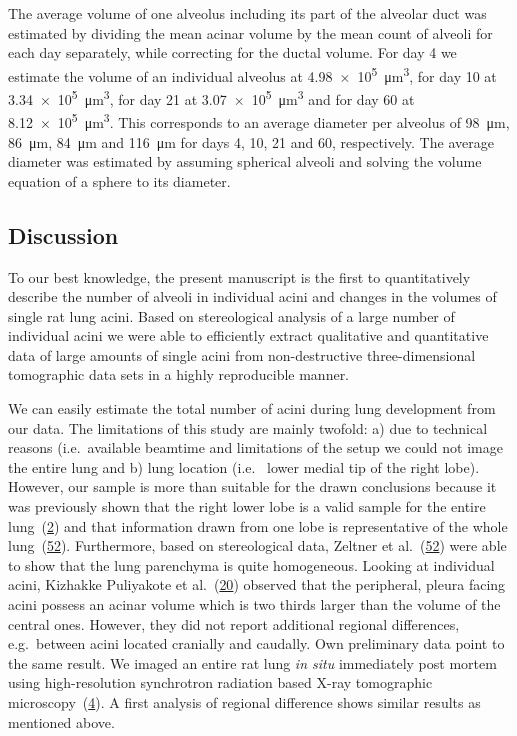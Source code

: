 \documentclass[
  american,
]{article}
\begin{document}
The average volume of one alveolus including its part of the alveolar duct was estimated by dividing the mean acinar volume by the mean count of alveoli for each day separately, while correcting for the ductal volume.
For day 4 we estimate the volume of an individual alveolus at 4.98~×~10\textsuperscript{5}~μm\textsuperscript{3}, for day 10 at 3.34~×~10\textsuperscript{5}~μm\textsuperscript{3}, for day 21 at 3.07~×~10\textsuperscript{5}~μm\textsuperscript{3} and for day 60 at 8.12~×~10\textsuperscript{5}~μm\textsuperscript{3}.
This corresponds to an average diameter per alveolus of 98~μm, 86~μm, 84~μm and 116~μm for days 4, 10, 21 and 60, respectively.
The average diameter was estimated by assuming spherical alveoli and solving the volume equation of a sphere to its diameter.

\hypertarget{discussion}{%
\subsection{Discussion}\label{discussion}}

To our best knowledge, the present manuscript is the first to quantitatively describe the number of alveoli in individual acini and changes in the volumes of single rat lung acini.
Based on stereological analysis of a large number of individual acini we were able to efficiently extract qualitative and quantitative data of large amounts of single acini from non-destructive three-dimensional tomographic data sets in a highly reproducible manner.

We can easily estimate the total number of acini during lung development from our data.
The limitations of this study are mainly twofold: a) due to technical reasons (i.e.~available beamtime and limitations of the setup we could not image the entire lung and b) lung location (i.e.~ lower medial tip of the right lobe).
However, our sample is more than suitable for the drawn conclusions because it was previously shown that the right lower lobe is a valid sample for the entire lung~(\protect\hyperlink{ref-14OP85b2F}{2}) and that information drawn from one lobe is representative of the whole lung~(\protect\hyperlink{ref-I9TmP6IU}{52}).
Furthermore, based on stereological data, Zeltner et al.~(\protect\hyperlink{ref-I9TmP6IU}{52}) were able to show that the lung parenchyma is quite homogeneous.
Looking at individual acini, Kizhakke Puliyakote et al.~(\protect\hyperlink{ref-RGBeCf8v}{20}) observed that the peripheral, pleura facing acini possess an acinar volume which is two thirds larger than the volume of the central ones.
However, they did not report additional regional differences, e.g.~between acini located cranially and caudally.
Own preliminary data point to the same result.
We imaged an entire rat lung \emph{in situ} immediately post mortem using high-resolution synchrotron radiation based X-ray tomographic microscopy~(\protect\hyperlink{ref-Zv1XcgAO}{4}).
A first analysis of regional difference shows similar results as mentioned above.
\end{document}
